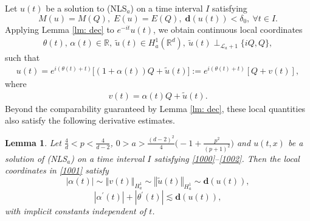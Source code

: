 \documentclass[12pt]{amsart}
\newcommand{\R}{\mathbb R}
\newcommand{\la}{\mathcal L_a}
\newcommand{\nha}{H^1_a}
\newtheorem{lemma}[theorem]{Lemma}
\begin{document}
Let $u(t)$ be a solution to (NLS$_a$) on a time interval $I$ satisfying 
\begin{equation}\label{1000}
M(u)=M(Q),\; E(u)=E(Q),\; \mathbf{d}(u(t))<\delta _{0},\ \forall t\in I.
\end{equation}
Applying Lemma \ref{lm: dec} to $e^{-it}u(t)$, we obtain continuous local coordinates 
\begin{align}
\theta(t)
, \, \alpha(t)\in \R, \ \tilde u(t)\in \nha (\R^d), \ \tilde u(t)\perp_{\la+1}\{iQ, Q\},\label{1001}
\end{align}
such that
\begin{align}\label{1002}
u(t)=e^{i(\theta(t)+t)}\bigl[(1+\alpha(t))Q+\tilde u(t)\bigr]:=e^{i(\theta(t)+t)}[Q+v(t)],
\end{align}
where
\begin{align}\label{vtu}
v(t)=\alpha(t) Q+\tilde u(t). 
\end{align}
Beyond the comparability guaranteed by Lemma \ref{lm: dec}, these local quantities also satisfy the following derivative estimates. 



\begin{lemma}
\label{L: Modulation} Let $\frac 4d<p<\frac 4{d-2}$, $0>a>\frac{(d-2)^2}4\bigl(-1+\frac{p^2}{(p+1)^2}\bigr)$ and $u(t,x)$ be a solution of (NLS$_a$) on a time interval $I$ satisfying \eqref{1000}--\eqref{1002}. Then the local coordinates in \eqref{1001} satisfy 
\begin{equation}
|\alpha (t)|\sim \left\Vert v(t)\right\Vert _{H_{a}^{1}}\sim \left\Vert 
\tilde{u}(t)\right\Vert _{H_{a}^{1}}\sim \mathbf{d}(u(t)),
\label{modulation 1}
\end{equation}%
\begin{equation}
|\alpha ^{\prime }(t)|+|\theta ^{\prime }(t)|\lesssim \mathbf{d}(u(t)),
\label{modulation 2}
\end{equation}%
with implicit constants independent of $t$. 
\end{lemma}
\end{document}
